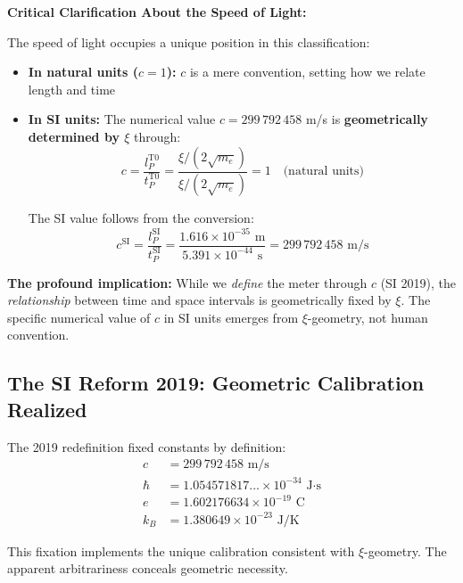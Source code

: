 \documentclass[12pt,a4paper]{article}
\begin{document}
	\begin{warning}
		\textbf{Critical Clarification About the Speed of Light:}
		
		The speed of light occupies a unique position in this classification:
		
		\begin{itemize}
			\item \textbf{In natural units ($c = 1$):} $c$ is a mere convention, setting how we relate length and time
			
			\item \textbf{In SI units:} The numerical value $c = 299\,792\,458$ m/s is \textbf{geometrically determined by $\xi$} through:
			\begin{equation}
				c = \frac{l_P^{\text{T0}}}{t_P^{\text{T0}}} = \frac{\xi/(2\sqrt{m_e})}{\xi/(2\sqrt{m_e})} = 1 \quad \text{(natural units)}
			\end{equation}
			
			The SI value follows from the conversion:
			\begin{equation}
				c^{\text{SI}} = \frac{l_P^{\text{SI}}}{t_P^{\text{SI}}} = \frac{1.616 \times 10^{-35} \text{ m}}{5.391 \times 10^{-44} \text{ s}} = 299\,792\,458 \text{ m/s}
			\end{equation}
		\end{itemize}
		
		\textbf{The profound implication:} While we \emph{define} the meter through $c$ (SI 2019), the \emph{relationship} between time and space intervals is geometrically fixed by $\xi$. The specific numerical value of $c$ in SI units emerges from $\xi$-geometry, not human convention.
	\end{warning}
	
	\subsection{The SI Reform 2019: Geometric Calibration Realized}
	
	The 2019 redefinition fixed constants by definition:
	\begin{align}
		c &= 299\,792\,458 \text{ m/s} \\
		\hbar &= 1.054571817... \times 10^{-34} \text{ J·s} \\
		e &= 1.602176634 \times 10^{-19} \text{ C} \\
		k_B &= 1.380649 \times 10^{-23} \text{ J/K}
	\end{align}
	
	\begin{insight}
		This fixation implements the unique calibration consistent with $\xi$-geometry. The apparent arbitrariness conceals geometric necessity.
	\end{insight}
	
\end{document}
